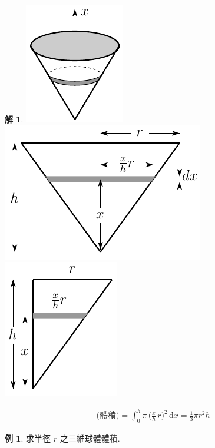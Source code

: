 \documentclass[12pt]{extarticle}
\theoremstyle{definition}
\newtheorem*{ex}{例}
\newtheorem*{sol}{解}
\begin{document}
\begin{sol}
  \begin{minipage}{.6\textwidth}
    \includegraphics[scale=1.3]{cone}\;\includegraphics[scale=.9]{coneX}\;\includegraphics[scale=.9]{coneT}
  \end{minipage}
  \begin{minipage}{.35\textwidth}
    \begin{align*}
      \text{(體積)} = \int_0^h\!\pi\,\Big(\frac{x}{h}\,r\Big)^2\,\text{d}x = \frac{1}{3}\pi r^2 h
    \end{align*}
  \end{minipage}
\end{sol}


\begin{ex}
  求半徑 $r$ 之三維球體體積.
\end{ex}
\end{document}
